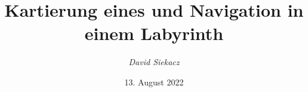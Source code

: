 \title{Kartierung eines und Navigation in einem Labyrinth}
\author{\textit{David Siekacz}}
\date{13. August 2022}

\titlehead{Hochschule Mannheim}
\subject{Schriftliche Arbeit}
\publishers{Betreut durch Prof. Dr. Thomas Ihme}
\usepackage[defernumbers=true,backend=biber,
isbn=false,                  %
autocite=inline,             %
style=ieee,       %
hyperref=true,                  %
citestyle=numeric-comp,         %
natbib=true                     %
]{biblatex}  

